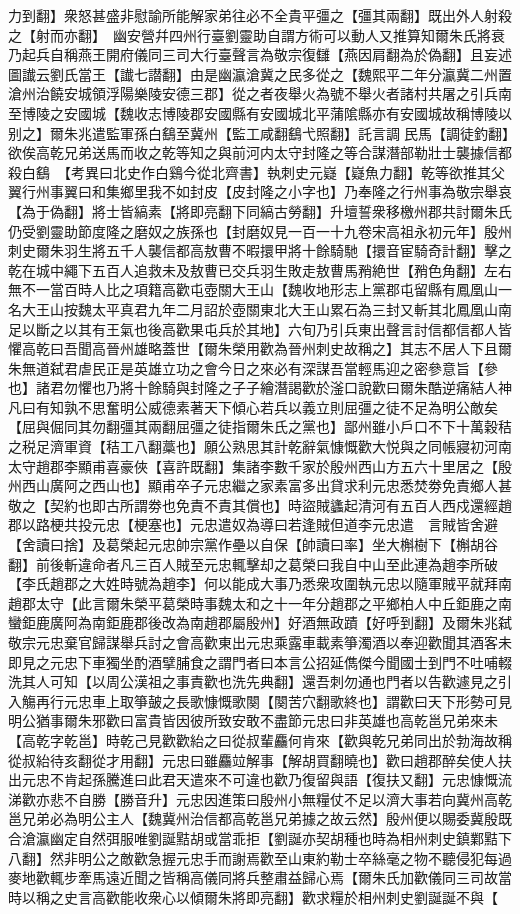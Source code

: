 力到翻】衆怒甚盛非慰諭所能解家弟往必不全貴平彊之【彊其兩翻】既出外人射殺之【射而亦翻】　幽安營幷四州行臺劉靈助自謂方術可以動人又推算知爾朱氏將衰乃起兵自稱燕王開府儀同三司大行臺聲言為敬宗復讎【燕因肩翻為於偽翻】且妄述圖䜟云劉氏當王【䜟七譛翻】由是幽瀛滄冀之民多從之【魏熙平二年分瀛冀二州置滄州治饒安城領浮陽樂陵安德三郡】從之者夜舉火為號不舉火者諸村共屠之引兵南至博陵之安國城【魏收志博陵郡安國縣有安國城北平蒲隂縣亦有安國城故稱博陵以别之】爾朱兆遣監軍孫白鷂至冀州【監工咸翻鷂弋照翻】託言調民馬【調徒釣翻】欲俟高乾兄弟送馬而收之乾等知之與前河内太守封隆之等合謀潛部勒壯士襲據信都殺白鷂　【考異曰北史作白鷄今從北齊書】執刺史元嶷【嶷魚力翻】乾等欲推其父翼行州事翼曰和集鄉里我不如封皮【皮封隆之小字也】乃奉隆之行州事為敬宗舉哀【為于偽翻】將士皆縞素【將即亮翻下同縞古勞翻】升壇誓衆移檄州郡共討爾朱氏仍受劉靈助節度隆之磨奴之族孫也【封磨奴見一百一十九卷宋高祖永初元年】殷州刺史爾朱羽生將五千人襲信都高敖曹不暇擐甲將十餘騎馳【擐音宦騎奇計翻】擊之乾在城中繩下五百人追救未及敖曹已交兵羽生敗走敖曹馬矟絶世【矟色角翻】左右無不一當百時人比之項籍高歡屯壺關大王山【魏收地形志上黨郡屯留縣有鳳凰山一名大王山按魏太平真君九年二月詔於壺關東北大王山累石為三封又斬其北鳳凰山南足以斷之以其有王氣也後高歡果屯兵於其地】六旬乃引兵東出聲言討信都信都人皆懼高乾曰吾聞高晉州雄略蓋世【爾朱榮用歡為晉州刺史故稱之】其志不居人下且爾朱無道弑君虐民正是英雄立功之會今日之來必有深謀吾當輕馬迎之密參意旨【參也】諸君勿懼也乃將十餘騎與封隆之子子繪潛謁歡於滏口說歡曰爾朱酷逆痛結人神凡曰有知孰不思奮明公威德素著天下傾心若兵以義立則屈彊之徒不足為明公敵矣【屈與倔同其勿翻彊其兩翻屈彊之徒指爾朱氏之黨也】鄙州雖小戶口不下十萬穀秸之税足濟軍資【秸工八翻藁也】願公熟思其計乾辭氣慷慨歡大悦與之同帳寢初河南太守趙郡李顯甫喜豪俠【喜許既翻】集諸李數千家於殷州西山方五六十里居之【殷州西山廣阿之西山也】顯甫卒子元忠繼之家素富多出貸求利元忠悉焚劵免責鄉人甚敬之【契約也即古所謂劵也免責不責其償也】時盜賊蠭起清河有五百人西戍還經趙郡以路梗共投元忠【梗塞也】元忠遣奴為導曰若逢賊但道李元忠遣　言賊皆舍避【舍讀曰捨】及葛榮起元忠帥宗黨作壘以自保【帥讀曰率】坐大槲樹下【槲胡谷翻】前後斬違命者凡三百人賊至元忠輒擊却之葛榮曰我自中山至此連為趙李所破【李氏趙郡之大姓時號為趙李】何以能成大事乃悉衆攻圍執元忠以隨軍賊平就拜南趙郡太守【此言爾朱榮平葛榮時事魏太和之十一年分趙郡之平鄉柏人中丘鉅鹿之南蠻鉅鹿廣阿為南鉅鹿郡後改為南趙郡屬殷州】好酒無政蹟【好呼到翻】及爾朱兆弑敬宗元忠棄官歸謀舉兵討之會高歡東出元忠乘露車載素箏濁酒以奉迎歡聞其酒客未即見之元忠下車獨坐酌酒擘脯食之謂門者曰本言公招延儁傑今聞國士到門不吐哺輟洗其人可知【以周公漢祖之事責歡也洗先典翻】還吾刺勿通也門者以告歡遽見之引入觴再行元忠車上取箏皷之長歌慷慨歌闋【闋苦穴翻歌終也】謂歡曰天下形勢可見明公猶事爾朱邪歡曰富貴皆因彼所致安敢不盡節元忠曰非英雄也高乾邕兄弟來未【高乾字乾邕】時乾己見歡歡紿之曰從叔輩麤何肯來【歡與乾兄弟同出於勃海故稱從叔紿待亥翻從才用翻】元忠曰雖麤竝解事【解胡買翻曉也】歡曰趙郡醉矣使人扶出元忠不肯起孫騰進曰此君天遣來不可違也歡乃復留與語【復扶又翻】元忠慷慨流涕歡亦悲不自勝【勝音升】元忠因進策曰殷州小無糧仗不足以濟大事若向冀州高乾邕兄弟必為明公主人【魏冀州治信都高乾邕兄弟據之故云然】殷州便以賜委冀殷既合滄瀛幽定自然弭服唯劉誕黠胡或當乖拒【劉誕亦契胡種也時為相州刺史鎮鄴黠下八翻】然非明公之敵歡急握元忠手而謝焉歡至山東約勒士卒絲毫之物不聽侵犯每過麥地歡輒步牽馬遠近聞之皆稱高儀同將兵整肅益歸心焉【爾朱氏加歡儀同三司故當時以稱之史言高歡能收衆心以傾爾朱將即亮翻】歡求糧於相州刺史劉誕誕不與【